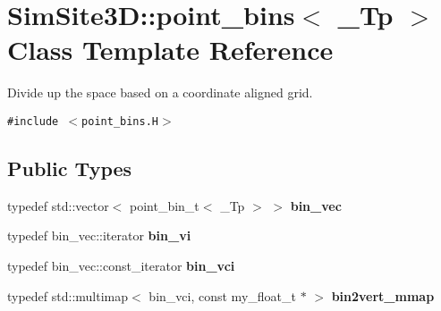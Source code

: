 \section{SimSite3D::point\_\-bins$<$ \_\-Tp $>$ Class Template Reference}
\label{classSimSite3D_1_1point__bins}
Divide up the space based on a coordinate aligned grid.  


{\tt \#include $<$point\_\-bins.H$>$}

\subsection*{Public Types}
\begin{CompactItemize}
\item 
typedef std::vector$<$ point\_\-bin\_\-t$<$ \_\-Tp $>$ $>$ \textbf{bin\_\-vec}\label{classSimSite3D_1_1point__bins_dfb6ebb20eb7f4497553a21504367efa}

\item 
typedef bin\_\-vec::iterator \textbf{bin\_\-vi}\label{classSimSite3D_1_1point__bins_2612ddc643a2f477309393a2c8ded71c}

\item 
typedef bin\_\-vec::const\_\-iterator \textbf{bin\_\-vci}\label{classSimSite3D_1_1point__bins_32892df5e6abb8c0d4241ef6ed439604}

\item 
typedef std::multimap$<$ bin\_\-vci, const my\_\-float\_\-t $\ast$ $>$ \textbf{bin2vert\_\-mmap}\label{classSimSite3D_1_1point__bins_39a6b59e9bbd2dea53aa1715e9729edf}

\end{CompactItemize}
